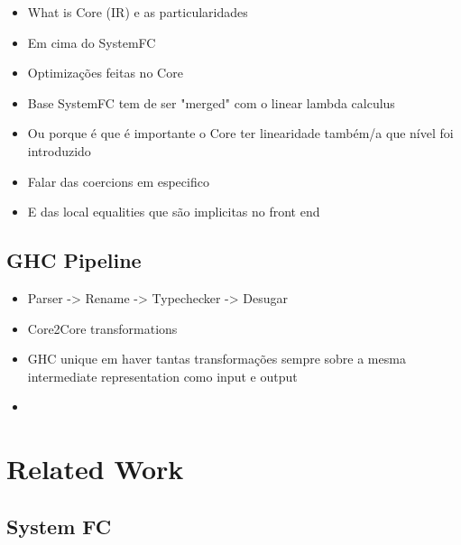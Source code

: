\documentclass[a4paper, draft]{report}
\begin{document}
\begin{itemize}
    \item What is Core (IR) e as particularidades
    \item Em cima do SystemFC
    \item Optimizações feitas no Core
    \item Base SystemFC tem de ser "merged" com o linear lambda calculus
    \item Ou porque é que é importante o Core ter linearidade também/a que nível
        foi introduzido
    \item Falar das coercions em especifico
    \item E das local equalities que são implicitas no front end
\end{itemize}

\section{GHC Pipeline}

\begin{itemize}
    \item Parser -> Rename -> Typechecker -> Desugar
    \item Core2Core transformations
    \item GHC unique em haver tantas transformações sempre sobre a mesma intermediate
        representation como input e output
    \item 
\end{itemize}


\chapter{Related Work}

\section{System FC}
\end{document}
